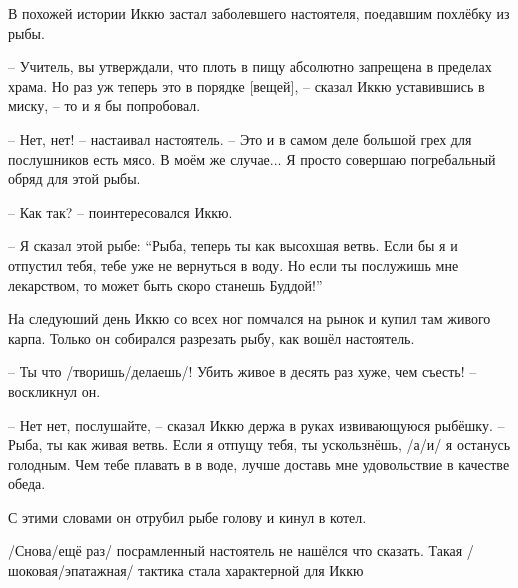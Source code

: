 \begin{ver}
В похожей истории Иккю застал заболевшего
настоятеля, поедавшим похлёбку из рыбы.

-- Учитель, вы утверждали, что плоть в пищу абсолютно запрещена в
пределах храма. Но раз уж теперь это в порядке [вещей], -- сказал Иккю
уставившись в миску, -- то и я бы попробовал.

-- Нет, нет! -- настаивал настоятель. --
Это и в самом деле большой грех для
послушников есть мясо. В моём же
случае... Я просто совершаю погребальный обряд для этой рыбы.

-- Как так? -- поинтересовался Иккю.

-- Я сказал этой рыбе: ``Рыба, теперь ты как высохшая ветвь. Если бы я
и отпустил тебя, тебе уже не вернуться в воду. Но если ты послужишь мне
лекарством, то может быть скоро станешь Буддой!'' 

На следуюший день Иккю со всех ног помчался на рынок и купил там
живого карпа. Только он собирался разрезать рыбу, как вошёл
настоятель.

-- Ты что /творишь/делаешь/! Убить живое в десять раз хуже, чем
съесть! -- воскликнул он.

-- Нет нет, послушайте, -- сказал Иккю держа в руках извивающуюся
рыбёшку. -- Рыба, ты как живая ветвь. Если я отпущу тебя, ты
ускользнёшь, /а/и/ я останусь голодным. Чем тебе плавать в в воде, лучше
доставь мне удовольствие в качестве обеда.

С этими словами он отрубил рыбе голову и кинул в котел.

/Снова/ещё раз/ посрамленный настоятель не нашёлся что сказать.
Такая /шоковая/эпатажная/ тактика стала характерной для
Иккю
\end{ver}

